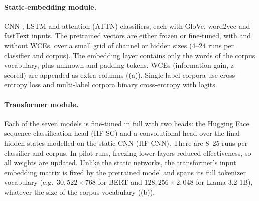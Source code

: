 \documentclass{ijis}
\begin{document}
\paragraph{Static-embedding module.} CNN \cite{yoon2014convolutional}, LSTM \cite{hochreiterlong} and attention (ATTN) \cite{liuguo2019bidirectional} classifiers, each with GloVe, word2vec and fastText inputs. The pretrained vectors are either frozen or fine-tuned, with and without WCEs, over a small grid of channel or hidden sizes (4--24 runs per classifier and corpus). The embedding layer contains only the words of the corpus vocabulary, plus unknown and padding tokens. WCEs (information gain, z-scored) are appended as extra columns ((a)). Single-label corpora use cross-entropy loss and multi-label corpora binary cross-entropy with logits.

\paragraph{Transformer module.} Each of the seven models is fine-tuned in full with two heads: the Hugging Face sequence-classification head (HF-SC) and a convolutional head over the final hidden states modelled on the static CNN (HF-CNN). There are 8--25 runs per classifier and corpus. In pilot runs, freezing lower layers reduced effectiveness, so all weights are updated. Unlike the static networks, the transformer's input embedding matrix is fixed by the pretrained model and spans its full tokenizer vocabulary (e.g.\ $30{,}522 \times 768$ for BERT and $128{,}256 \times 2{,}048$ for Llama-3.2-1B), whatever the size of the corpus vocabulary ((b)).
\end{document}
